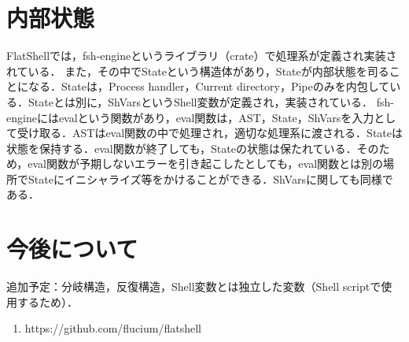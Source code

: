 \documentclass{article}
\begin{document}
\newpage

\section{内部状態}
FlatShellでは，fsh-engineというライブラリ（crate）で処理系が定義され実装されている．\newline
また，その中でStateという構造体があり，Stateが内部状態を司ることになる．Stateは，Process handler，Current directory，Pipeのみを内包している．Stateとは別に，ShVarsというShell変数が定義され，実装されている．\newline
fsh-engineにはevalという関数があり，eval関数は，AST，State，ShVarsを入力として受け取る．ASTはeval関数の中で処理され，適切な処理系に渡される．Stateは状態を保持する．eval関数が終了しても，Stateの状態は保たれている．そのため，eval関数が予期しないエラーを引き起こしたとしても，eval関数とは別の場所でStateにイニシャライズ等をかけることができる．ShVarsに関しても同様である．

\newpage

\section{今後について}
追加予定：分岐構造，反復構造，Shell変数とは独立した変数（Shell scriptで使用するため）．

\newpage




\begin{enumerate}
    \item https://github.com/flucium/flatshell
\end{enumerate}
\end{document}
